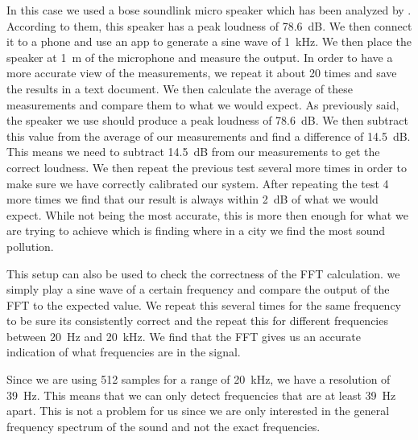     In this case we used a bose soundlink micro speaker which has been analyzed by \cite{panoryiosBoseSoundLinkMicro2023}. According to them, this speaker has a peak loudness of 78.6~dB. We then connect it to a phone and use an app to generate a sine wave of 1~kHz. We then place the speaker at 1~m of the microphone and measure the output. In order to have a more accurate view of the measurements, we repeat it about 20 times and save the results in a text document. We then calculate the average of these measurements and compare them to what we would expect. As previously said, the speaker we use should produce a peak loudness of 78.6~dB. We then subtract this value from the average of our measurements and find a difference of 14.5~dB. This means we need to subtract 14.5~dB from our measurements to get the correct loudness. We then repeat the previous test several more times in order to make sure we have correctly calibrated our system. After repeating the test 4 more times we find that our result is always within 2~dB of what we would expect. While not being the most accurate, this is more then enough for what we are trying to achieve which is finding where in a city we find the most sound pollution.

    This setup can also be used to check the correctness of the FFT calculation. we simply play a sine wave of a certain frequency and compare the output of the FFT to the expected value. We repeat this several times for the same frequency to be sure its consistently correct and the repeat this for different frequencies between 20~Hz and 20~kHz. We find that the FFT gives us an accurate indication of what frequencies are in the signal. 
    
    Since we are using 512 samples for a range of 20~kHz, we have a resolution of 39~Hz. This means that we can only detect frequencies that are at least 39~Hz apart. This is not a problem for us since we are only interested in the general frequency spectrum of the sound and not the exact frequencies.